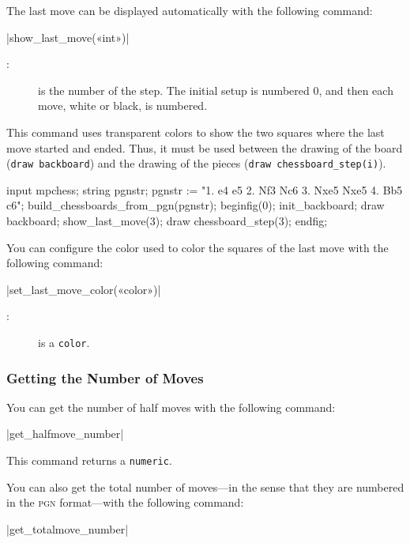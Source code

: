\documentclass[english]{ltxdoc}
\begin{document}
The last move can be displayed automatically with the following command:

\commande|show_last_move(«int»)|\smallskip

\begin{description}
\item[:] is the number of the step. The initial setup is numbered 0, and then each move, white or black, is numbered.
\end{description}

This command uses transparent colors to show the two squares where the last move
started and ended. Thus, it must be used between the drawing of the board
(\lstinline+draw backboard+) and the drawing of the pieces 
(\lstinline+draw chessboard_step(i)+).

\begin{ExempleMP}
input mpchess;
string pgnstr;
pgnstr := "1. e4 e5 2. Nf3 Nc6 3. Nxe5 Nxe5 4. Bb5 c6";
build_chessboards_from_pgn(pgnstr);
beginfig(0);
init_backboard;
draw backboard;
show_last_move(3);
draw chessboard_step(3); %
endfig;
\end{ExempleMP}

You can configure the color used to color the squares of the last
move with the following command:

\commande|set_last_move_color(«color»)|\smallskip
\begin{description}
  \item[:] is a \MP{} \lstinline+color+.
\end{description}



\subsubsection{Getting the Number of Moves}

You can get the number of half moves with the following command:

\commande|get_halfmove_number|\smallskip

This command returns a \lstinline+numeric+.

You can also get the total number of moves---in the sense that they are numbered
in the \textsc{pgn} format---with the following command:

\commande|get_totalmove_number|\smallskip
\end{document}
